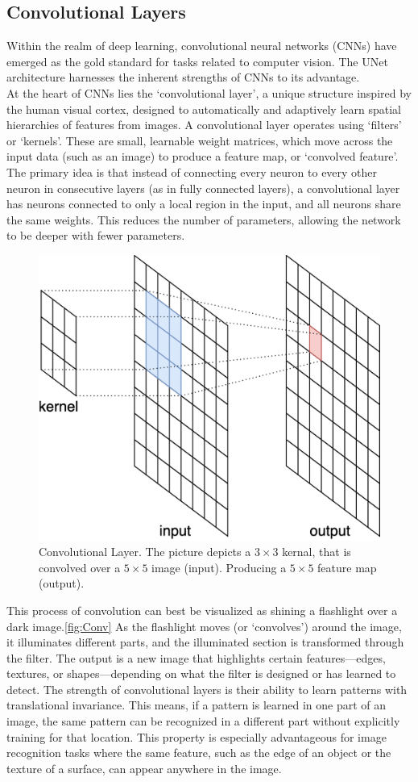 \subsection{Convolutional Layers}
Within the realm of deep learning, convolutional neural networks (CNNs) have emerged as the gold standard for tasks related to computer vision.
The UNet architecture harnesses the inherent strengths of CNNs to its advantage.\\
\noindent At the heart of CNNs lies the `convolutional layer', a unique structure inspired by the human visual cortex, designed to automatically and adaptively learn spatial hierarchies of features from images.
A convolutional layer operates using `filters' or `kernels'. These are small, learnable weight matrices, which move across the input data (such as an image) to produce a feature map, or `convolved feature'.
The primary idea is that instead of connecting every neuron to every other neuron in consecutive layers (as in fully connected layers),
a convolutional layer has neurons connected to only a local region in the input, and all neurons share the same weights. This reduces the number of parameters,
allowing the network to be deeper with fewer parameters.\cite[5-7]{oshea_introduction_2015}

\begin{figure}[!hb]
	\centering
	\includegraphics[width=0.4\linewidth]{images/Convolution}
	\caption{Convolutional Layer. The picture depicts a $3\times3$ kernal, that is convolved over a $5\times5$ image (input). Producing a $5\times5$ feature map (output).}
	\label{fig:Conv}
\end{figure}

This process of convolution can best be visualized as shining a flashlight over a dark image.\autoref{fig:Conv} As the flashlight moves (or `convolves') around the image,
it illuminates different parts, and the illuminated section is transformed through the filter. The output is a new image that highlights certain features—edges,
textures, or shapes—depending on what the filter is designed or has learned to detect.
The strength of convolutional layers is their ability to learn patterns with translational invariance. This means,
if a pattern is learned in one part of an image, the same pattern can be recognized in a different part without explicitly training for that location.
This property is especially advantageous for image recognition tasks where the same feature, such as the edge of an object or the texture of a surface, can appear anywhere in the image.

